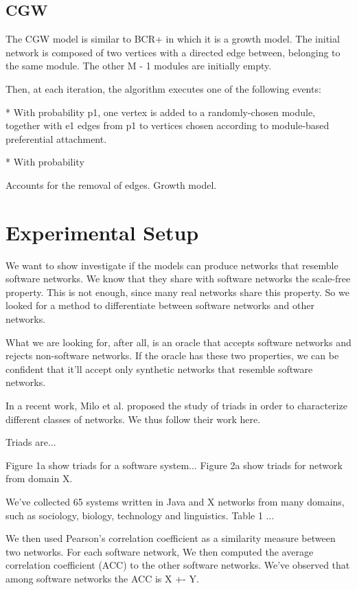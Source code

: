 \subsection{CGW}

The CGW model is similar to BCR+ in which it is a growth model. The initial
network is composed of two vertices with a directed edge between, belonging
to the same module. The other M - 1 modules are initially empty.

Then, at each iteration, the algorithm executes one of the following events:

* With probability p1, one vertex is added to a randomly-chosen module, together
with e1 edges from p1 to vertices chosen according to module-based preferential
attachment.

* With probability 

Accounts for the removal of edges. Growth model.

\section{Experimental Setup}

We want to show investigate if the models can produce networks that resemble
software networks. We know that they share with software networks the scale-free
property. This is not enough, since many real networks share this property. So
we looked for a method to differentiate between software networks and other
networks.

What we are looking for, after all, is an oracle that accepts software networks
and rejects non-software networks. If the oracle has these two properties, we
can be confident that it'll accept only synthetic networks that resemble
software networks.

In a recent work, Milo et al. proposed the study of triads in order to
characterize different classes of networks. We thus follow their work here.

Triads are...

Figure 1a show triads for a software system... Figure 2a show triads for network
from domain X.

We've collected 65 systems written in Java and X networks from many domains,
such as sociology, biology, technology and linguistics.
Table 1 ...

We then used Pearson's correlation coefficient as a similarity measure between
two networks. For each software network, We then computed the average
correlation coefficient (ACC) to the other software networks. We've observed
that among software networks the ACC is X +- Y.

